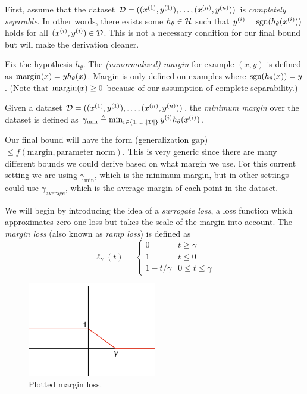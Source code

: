 First, assume that the dataset $\mathcal D = ((x^{(1)}, y^{(1)}), \dots, (x^{(n)}, y^{(n)}))$ is \textit{completely separable}. In other words, there exists some $h_\theta\in\mathcal H$ such that $y^{(i)} = \text{sgn}(h_\theta(x^{(i)}))$ holds for all $( x^{(i)},y^{(i)})\in \mathcal D$. This is not a necessary condition for our final bound but will make the derivation cleaner.

\begin{definition}
Fix the hypothesis $h_\theta$. The \textit{(unnormalized) margin} for example $(x, y)$ is defined as $\text{margin}(x) = yh_\theta(x)$. Margin is only defined on examples where $\text{sgn}(h_\theta(x)) = y$. (Note that $\text{margin}(x)\geq 0$ because of our assumption of complete separability.)
\end{definition}

\begin{definition} Given a dataset $\mathcal D = ((x^{(1)}, y^{(1)}), \dots, (x^{(n)}, y^{(n)}))$, the \textit{minimum margin} over the dataset is defined as $\gamma_{\min} \triangleq \min_{i\in\{1,\dots,|\mathcal D|\}} y^{(i)}h_\theta(x^{(i)})$.
\end{definition}

Our final bound will have the form (generalization gap)$\leq f(\text{margin},\text{parameter norm})$. This is very generic since there are many different bounds we could derive based on what margin we use. For this current setting we are using $\gamma_{\min}$, which is the minimum margin, but in other settings could use $\gamma_{\text{average}}$, which is the average margin of each point in the dataset.

We will begin by introducing the idea of a \textit{surrogate loss}, a loss function which approximates zero-one loss but takes the scale of the margin into account. The \textit{margin loss} (also known as \textit{ramp loss}) is defined as 
\begin{equation}
    \ell_\gamma(t) = \begin{cases} 
      0 & t\geq \gamma \\
      1 & t\leq 0 \\
      1-t/\gamma & 0\leq t\leq \gamma
   \end{cases}
\end{equation}

\begin{figure}[ht!]
    \begin{center}
  \includegraphics[width=0.5\textwidth]{figures/margin_loss.png}
  \end{center}
  \caption{Plotted margin loss.}
  \label{lec6:fig:marginloss}
\end{figure}

